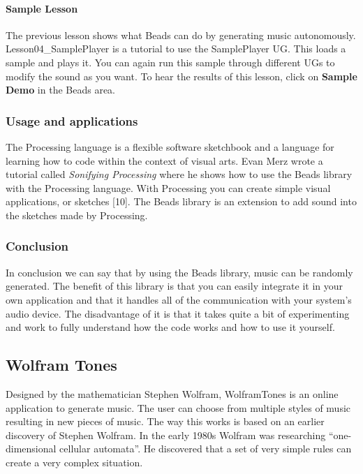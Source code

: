 \documentclass[12pt]{article}
\begin{document}
\paragraph{Sample Lesson}

The previous lesson shows what Beads can do by generating music autonomously. Lesson04\_SamplePlayer is a tutorial to use the SamplePlayer UG. This loads a sample and plays it. You can again run this sample through different UGs to modify the sound as you want. To hear the results of this lesson, click on \textbf{Sample Demo} in the Beads area. 

\subsubsection{Usage and applications}

The Processing language is a flexible software sketchbook and a language for learning how to code within the context of visual arts. Evan Merz wrote a tutorial called \textit{Sonifying Processing} where he shows how to use the Beads library with the Processing language. With Processing you can create simple visual applications, or sketches [10]. The Beads library is an extension to add sound into the sketches made by Processing.

\subsubsection{Conclusion}

In conclusion we can say that by using the Beads library, music can be randomly generated. The benefit of this library is that you can easily integrate it in your own application and that it handles all of the communication with your system's audio device. The disadvantage of it is that it takes quite a bit of experimenting and work to fully understand how the code works and how to use it yourself.

\subsection{Wolfram Tones}

Designed by the mathematician Stephen Wolfram, WolframTones is an online application to generate music. The user can choose from multiple styles of music resulting in new pieces of music. The way this works is based on an earlier discovery of Stephen Wolfram. In the early 1980s Wolfram was researching ``one-dimensional cellular automata''. He discovered that a set of very simple rules can create a very complex situation. 
\newline
\end{document}

